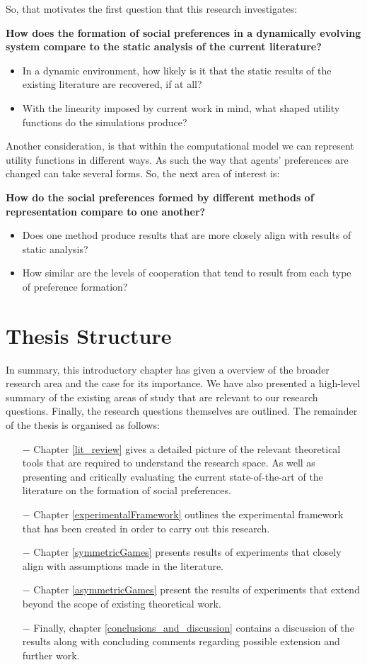 \documentclass[11pt]{book}
\newcommand*{\np}{\par\noindent\newline}
\begin{document}
\np So, that motivates the first question that this research investigates:
\np\textbf{How does the formation of social preferences in a dynamically evolving system compare to the static analysis of the current literature?}
\begin{itemize}
\item In a dynamic environment, how likely is it that the static results of the existing literature are recovered, if at all? 
\item With the linearity imposed by current work in mind, what shaped utility functions do the simulations produce?
\end{itemize}
Another consideration, is that within the computational model we can represent utility functions in different ways.
As such the way that agents' preferences are changed can take several forms.
So, the next area of interest is:
\np\textbf{How do the social preferences formed by different methods of representation compare to one another?}
\begin{itemize}
\item Does one method produce results that are more closely align with results of static analysis?	
\item How similar are the levels of cooperation that tend to result from each type of preference formation?
\end{itemize}

\section{Thesis Structure}
In summary, this introductory chapter has given a overview of the broader research area and the case for its importance.
We have also presented a high-level summary of the existing areas of study that are relevant to our research questions.
Finally, the research questions themselves are outlined.
The remainder of the thesis is organised as follows:

\begin{itemize}
	\item[$-$] Chapter \ref{lit_review} gives a detailed picture of the relevant theoretical tools that are required to understand the research space. 
		As well as presenting and critically evaluating the current state-of-the-art of the literature on the formation of social preferences.
	\item[$-$] Chapter \ref{experimentalFramework} outlines the experimental framework that has been created in order to carry out this research.
	\item [$-$] Chapter \ref{symmetricGames} presents results of experiments that closely align with assumptions made in the literature.
	\item [$-$] Chapter \ref{asymmetricGames} present the results of experiments that extend beyond the scope of existing theoretical work.
	\item [$-$] Finally, chapter \ref{conclusions_and_discussion} contains a discussion of the results along with concluding comments regarding possible extension and further work.
\end{itemize}
\end{document}
